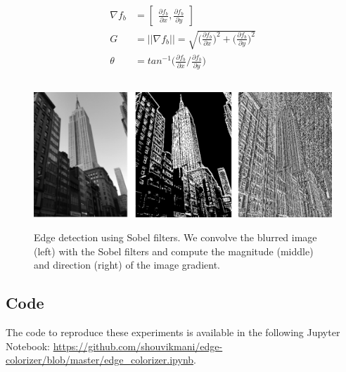 \documentclass{article}
\begin{document}
\begin{align}
\nabla f_b &= \begin{bmatrix} \frac{\partial f_b}{\partial x}, \frac{\partial f_b}{\partial y} \end{bmatrix} \\
G &= \vert \vert \nabla f_b \vert \vert = \sqrt{\Big( \frac{\partial f_b}{\partial x} \Big)^2 + \Big( \frac{\partial f_b}{\partial y} \Big)^2} \\
\theta &= tan^{-1} \Big(\frac{\partial f_b}{\partial x} / \frac{\partial f_b}{\partial y}\Big)
\end{align}

\begin{figure}[h!]
\centering
\includegraphics[height=5.5cm]{images/edge.png}
\caption{Edge detection using Sobel filters. We convolve the blurred image (left) with the Sobel filters and compute the magnitude (middle) and direction (right) of the image gradient.}
\label{fig:example}
\end{figure}

\subsection{Code}

The code to reproduce these experiments is available in the following Jupyter Notebook: \url{https://github.com/shouvikmani/edge-colorizer/blob/master/edge_colorizer.ipynb}.
\end{document}
